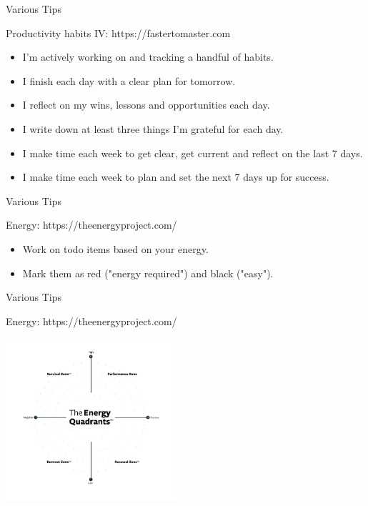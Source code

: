 \begin{frame}{Various Tips}
  \begin{block}{Productivity habits IV: https://fastertomaster.com}
    \begin{itemize}
      \item I'm actively working on and tracking a handful of habits.
      \item I finish each day with a clear plan for tomorrow. 
      \item I reflect on my wins, lessons and opportunities each day.
      \item I write down at least three things I’m grateful for each day.
      \item I make time each week to get clear, get current and reflect on the last 7 days.
      \item I make time each week to plan and set the next 7 days up for success.
    \end{itemize}
  \end{block}
\end{frame}

\begin{frame}{Various Tips}
  \begin{block}{Energy: https://theenergyproject.com/}
    \begin{itemize}
      \item Work on todo items based on your energy.
      \item Mark them as red ("energy required") and black ("easy").
    \end{itemize}
  \end{block}
\end{frame}

\begin{frame}{Various Tips}
  \begin{block}{Energy: https://theenergyproject.com/}
    \begin{center}
      \includegraphics[height=6cm]{img/the-energy-project.png}
    \end{center}
  \end{block}
\end{frame}

